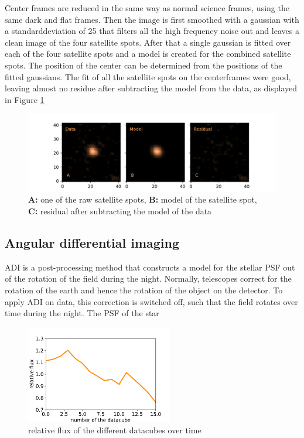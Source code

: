 \documentclass[twoside,single]{lion-msc}
\begin{document}
\bigskip
Center frames are reduced in the same way as normal science frames, using the same dark and flat frames. Then the image is first smoothed with a gaussian with a standarddeviation of 25 that filters all the high frequency noise out and leaves a clean image of the four satellite spots. After that a single gaussian is fitted over each of the four satellite spots and a model is created for the combined satellite spots. The position of the center can be determined from the positions of the fitted gaussians. The fit of all the satellite spots on the centerframes were good, leaving almost no residue after subtracting the model from the data, as displayed in Figure \ref{fig:resultmodel}

\begin{figure}[!t]
\centering 
\includegraphics[width = \textwidth]{resultmodel}
\caption{\textbf{A:} one of the raw satellite spots, \textbf{B:} model of the satellite spot,\\ \textbf{C:} residual after subtracting the model of the data} 
\label{fig:resultmodel}
\end{figure}

\subsection{Angular differential imaging}
ADI is a post-processing method that constructs a model for the stellar PSF out of the rotation of the field during the night.\cite{Marois2005} Normally, telescopes correct for the rotation of the earth and hence the rotation of the object on the detector. To apply ADI on data, this correction is switched off, such that the field rotates over time during the night. The PSF of the star

\begin{figure}
\centering
\includegraphics[width = 0.57\textwidth]{aonorm}
\caption{relative flux of the different datacubes over time}
\label{fig:aonorm}
\end{figure}
\end{document}
